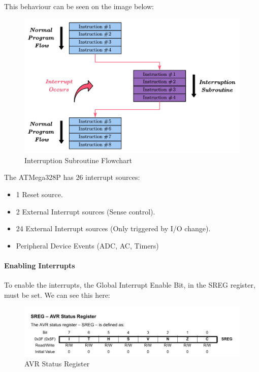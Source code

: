 This behaviour can be seen on the image below:

\begin{figure}[H]
    \centering
    \includegraphics[scale = 0.5]{Graphics/MICROS/Practice 3/Interrup_Flow_Chart.pdf}
    \caption{Interruption Subroutine Flowchart}
    \label{fig:ISR_FLOWCHART}
\end{figure}

The ATMega328P has 26 interrupt sources:~\autocite{SLIDES_MICROS}

\begin{itemize}
    \item 1 Reset source.
    \item 2 External Interrupt sources (Sense control).
    \item 24 External Interrupt sources (Only triggered by I/O change).
    \item Peripheral Device Events (ADC, AC, Timers)
\end{itemize}

\paragraph{Enabling Interrupts}

To enable the interrupts, the Global Interrupt Enable Bit, in the SREG register, must be set. We can see this here:

\begin{figure}[H]
    \centering
    \includegraphics[width = \textwidth]{Graphics/MICROS/Practice 3/DATASHEET/SREG.pdf}
    \caption{AVR Status Register~\autocite{ATMEGA328P}}
    \label{fig:SREG}
\end{figure}

